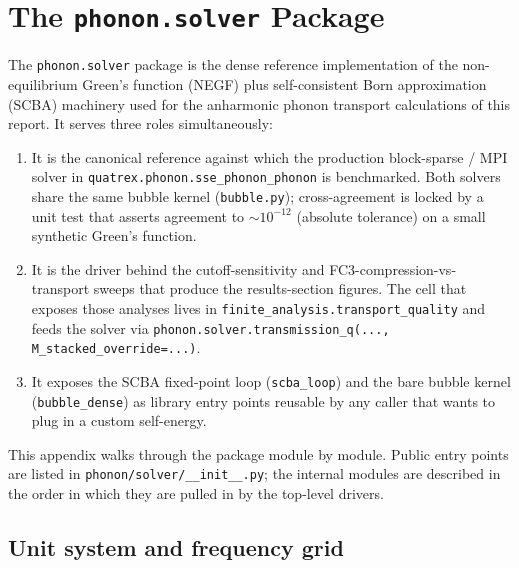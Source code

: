 \chapter{The \texttt{phonon.solver} Package}
\label{sec:phonon_solver_pkg}

The \texttt{phonon.solver} package is the dense reference implementation
of the non-equilibrium Green's function (NEGF) plus self-consistent
Born approximation (SCBA) machinery used for the anharmonic phonon
transport calculations of this report.  It serves three roles
simultaneously:

\begin{enumerate}
  \item It is the canonical reference against which the production
        block-sparse / MPI solver in
        \texttt{quatrex.phonon.sse\_phonon\_phonon} is benchmarked.
        Both solvers share the same bubble kernel
        (\texttt{bubble.py}); cross-agreement is locked by a unit
        test that asserts agreement to $\sim\!10^{-12}$ (absolute
        tolerance) on a small synthetic Green's function.
  \item It is the driver behind the cutoff-sensitivity and
        FC3-compression-vs-transport sweeps that produce the
        results-section figures.  The cell that exposes those
        analyses lives in \texttt{finite\_analysis.transport\_quality}
        and feeds the solver via
        \texttt{phonon.solver.transmission\_q(...,
        M\_stacked\_override=...)}.
  \item It exposes the SCBA fixed-point loop
        (\texttt{scba\_loop}) and the bare bubble kernel
        (\texttt{bubble\_dense}) as library entry points reusable by
        any caller that wants to plug in a custom self-energy.
\end{enumerate}

This appendix walks through the package module by module.  Public
entry points are listed in \texttt{phonon/solver/\_\_init\_\_.py}; the
internal modules are described in the order in which they are pulled
in by the top-level drivers.

\section{Unit system and frequency grid}
\label{sec:solver_units_grid}

